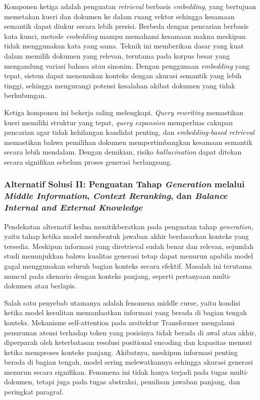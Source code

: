 Komponen ketiga adalah penguatan \textit{retrieval} berbasis \textit{embedding}, yang bertujuan memetakan kueri dan dokumen ke dalam ruang vektor sehingga kesamaan semantik dapat diukur secara lebih presisi. Berbeda dengan pencarian berbasis kata kunci, metode \textit{embedding} mampu memahami kesamaan makna meskipun tidak menggunakan kata yang sama. Teknik ini memberikan dasar yang kuat dalam memilih dokumen yang relevan, terutama pada korpus besar yang mengandung variasi bahasa atau sinonim. Dengan penggunaan \textit{embedding} yang tepat, sistem dapat menemukan konteks dengan akurasi semantik yang lebih tinggi, sehingga mengurangi potensi kesalahan akibat dokumen yang tidak berhubungan.

Ketiga komponen ini bekerja saling melengkapi. \textit{Query rewriting} memastikan kueri memiliki struktur yang tepat, \textit{query expansion} memperluas cakupan pencarian agar tidak kehilangan kandidat penting, dan \textit{embedding-based retrieval} memastikan bahwa pemilihan dokumen mempertimbangkan kesamaan semantik secara lebih mendalam. Dengan demikian, risiko \textit{hallucination} dapat ditekan secara signifikan sebelum proses generasi berlangsung.


\subsubsection{Alternatif Solusi II: Penguatan Tahap \textit{Generation} melalui \textit{Middle Information}, \textit{Context Reranking}, dan \textit{Balance Internal and External Knowledge}}

Pendekatan alternatif kedua menitikberatkan pada penguatan tahap \textit{generation}, yaitu tahap ketika model membentuk jawaban akhir berdasarkan konteks yang tersedia. Meskipun informasi yang diretrieval sudah benar dan relevan, sejumlah studi menunjukkan bahwa kualitas generasi tetap dapat menurun apabila model gagal menggunakan seluruh bagian konteks secara efektif. Masalah ini terutama muncul pada skenario dengan konteks panjang, seperti pertanyaan multi-dokumen atau berlapis.

Salah satu penyebab utamanya adalah fenomena middle curse, yaitu kondisi ketika model kesulitan memanfaatkan informasi yang berada di bagian tengah konteks. Mekanisme self-attention pada arsitektur Transformer mengalami penurunan atensi terhadap token yang posisinya tidak berada di awal atau akhir, diperparah oleh keterbatasan resolusi positional encoding dan kapasitas memori ketika memproses konteks panjang. Akibatnya, meskipun informasi penting berada di bagian tengah, model sering melewatkannya sehingga akurasi generasi menurun secara signifikan. Fenomena ini tidak hanya terjadi pada tugas multi-dokumen, tetapi juga pada tugas abstraksi, penulisan jawaban panjang, dan peringkat paragraf.

